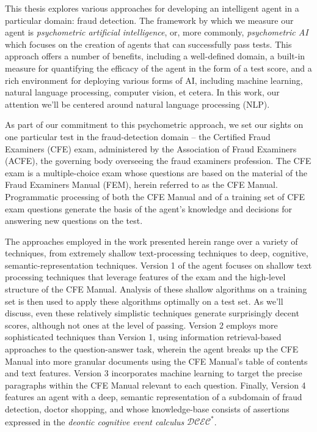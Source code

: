  
 
This thesis explores various approaches for developing an intelligent agent in a particular domain: fraud detection.  The framework by which we measure our agent is \textit{psychometric artificial intelligence}, or, more commonly, \textit{psychometric AI} which focuses on the creation of agents that can successfully pass tests.  This approach offers a number of benefits, including a well-defined domain, a built-in measure for quantifying the efficacy of the agent in the form of a test score, and a rich environment for deploying various forms of AI, including machine learning, natural language processing, computer vision, et cetera.  In this work, our attention we'll be centered around natural language processing (NLP).

As part of our commitment to this psychometric approach, we set our sights on one particular test in the fraud-detection domain -- the Certified Fraud Examiners (CFE) exam, administered by the Association of Fraud Examiners (ACFE), the governing body overseeing the fraud examiners profession.  The CFE exam is a multiple-choice exam whose questions are based on the material of the Fraud Examiners Manual (FEM), herein referred to as the CFE Manual.  Programmatic processing of both the CFE Manual and of a training set of CFE exam questions generate the basis of the agent's knowledge and decisions for answering new questions on the test.

The approaches employed in the work presented herein range over a variety of techniques, from extremely shallow text-processing techniques to deep, cognitive, semantic-representation techniques.  Version 1 of the agent focuses on shallow text processing techniques that leverage features of the exam and the high-level structure of the CFE Manual.  Analysis of these shallow algorithms on a training set is then used to apply these algorithms optimally on a test set.  As we'll discuss, even these relatively simplistic techniques generate surprisingly decent scores, although not ones at the level of passing.  Version 2 employs more sophisticated techniques than Version 1, using information retrieval-based approaches to the question-answer task, wherein the agent breaks up the CFE Manual into more granular documents using the CFE Manual's table of contents and text features.  Version 3 incorporates machine learning to target the precise paragraphs within the CFE Manual relevant to each question.  Finally, Version 4 features an agent with a deep, semantic representation of a subdomain of fraud detection, doctor shopping, and whose knowledge-base consists of assertions expressed in the \textit{deontic cognitive event calculus} $\mathcal{DCEC}^\ast$.

